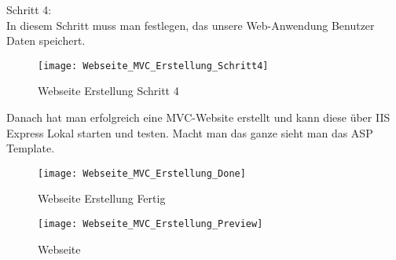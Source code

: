 {\begin{figure}[H]
    \label{fig:weberstell3}
\end{figure}Schritt 4:\\
In diesem Schritt muss man festlegen, das unsere Web-Anwendung Benutzer Daten speichert.
\begin{figure}[H]
    \texttt{[image: Webseite\_MVC\_Erstellung\_Schritt4]}
    \caption{Webseite Erstellung Schritt 4}
    \label{fig:weberstell4}
\end{figure}
Danach hat man erfolgreich eine MVC-Website erstellt und kann diese über IIS Express Lokal starten und testen. Macht man das ganze sieht man das ASP Template.\\
\begin{figure}[H]
    \texttt{[image: Webseite\_MVC\_Erstellung\_Done]}
    \caption{Webseite Erstellung Fertig}
    \label{fig:weberstellfertig}
\end{figure}
\begin{figure}[H]
    \texttt{[image: Webseite\_MVC\_Erstellung\_Preview]}
    \caption{Webseite}
    \label{fig:webseite}
\end{figure}
}
